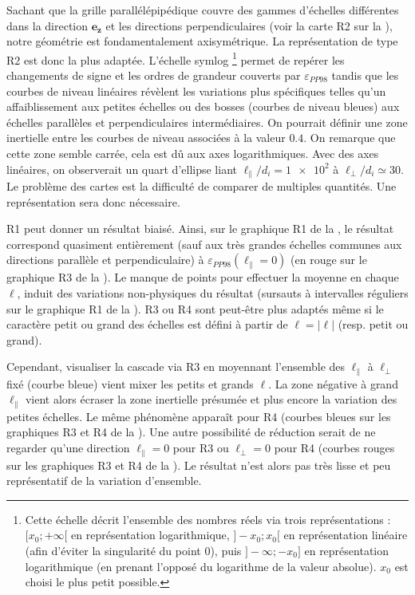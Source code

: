  Sachant que la grille parallélépipédique couvre des gammes d'échelles différentes dans la direction $\boldsymbol{e_z}$ et les directions perpendiculaires (voir la carte R2 sur la ), notre géométrie est fondamentalement axisymétrique. La représentation de type R2 est donc la plus adaptée. L'échelle \og symlog \fg{}\footnote{Cette échelle décrit l'ensemble des nombres réels via trois représentations : $[x_0;+\infty[$ en représentation logarithmique, $]-x_0;x_0[$ en représentation linéaire (afin d'éviter la singularité du point 0), puis  $]-\infty; -x_0]$ en représentation logarithmique (en prenant l'opposé du logarithme de la valeur absolue). $x_0$ est choisi le plus petit possible.} permet de repérer les changements de signe et les ordres de grandeur couverts par $\varepsilon_{PP98}$ tandis que les courbes de niveau linéaires révèlent les variations plus spécifiques telles qu'un affaiblissement aux petites échelles ou des bosses (courbes de niveau bleues) aux échelles parallèles et perpendiculaires intermédiaires. On pourrait définir une zone inertielle entre les courbes de niveau associées à la valeur $\num{0.4}$. On remarque que cette zone semble carrée, cela est dû aux axes logarithmiques. Avec des axes linéaires, on observerait un quart d'ellipse liant $\ell_{\parallel}/d_i = \num{1e2}$ à $\ell_{\perp}/d_i \simeq \num{30} $. Le problème des cartes est la difficulté de comparer de multiples quantités. Une représentation  sera donc nécessaire.

 R1 peut donner un résultat biaisé. Ainsi, sur le graphique R1 de la , le résultat correspond quasiment entièrement (sauf aux très grandes échelles communes aux directions parallèle et perpendiculaire) à $\varepsilon_{PP98} (\ell_{\parallel} = 0)$ (en rouge sur le graphique R3 de la ). Le manque de points pour effectuer la moyenne en chaque $\ell$, induit des variations non-physiques du résultat (sursauts à intervalles réguliers sur le graphique R1 de la ). R3 ou R4 sont peut-être plus adaptés même si le caractère petit ou grand des échelles est défini à partir de $\ell=|\boldsymbol{\ell}|$ (resp. petit ou grand). 
 
 Cependant, visualiser la cascade via R3 en moyennant l'ensemble des $\ell_{\parallel}$ à $\ell_{\perp}$ fixé (courbe bleue) vient mixer les petits et grands $\ell$. La zone négative à grand $\ell_{\parallel}$ vient alors écraser la zone inertielle présumée et plus encore la variation des petites échelles. Le même phénomène apparaît pour R4 (courbes bleues sur les graphiques R3 et R4 de la ). Une autre possibilité de réduction serait de ne regarder qu'une direction $\ell_{\parallel} = 0$ pour R3 ou $\ell_{\perp} = 0$ pour R4 (courbes rouges sur les graphiques R3 et R4 de la ). Le résultat n'est alors pas très lisse et peu représentatif de la variation d'ensemble. 


